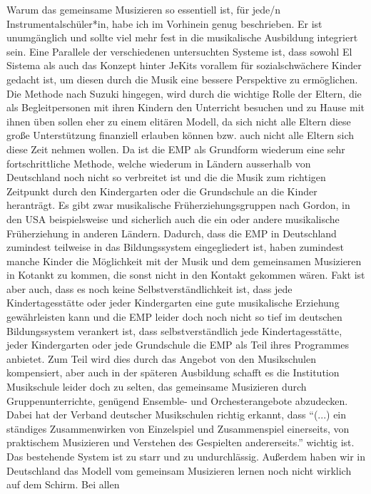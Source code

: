Warum das gemeinsame Musizieren so essentiell ist, für jede/n
Instrumentalschüler*in, habe ich im Vorhinein genug beschrieben. Er ist
unumgänglich und sollte viel mehr fest in die musikalische Ausbildung integriert
sein. Eine Parallele der verschiedenen untersuchten Systeme ist, dass sowohl El
Sistema als auch das Konzept hinter JeKits vorallem für sozialschwächere Kinder
gedacht ist, um diesen durch die Musik eine bessere Perspektive zu ermöglichen.
Die Methode nach Suzuki hingegen, wird durch die wichtige Rolle der Eltern, die
als Begleitpersonen mit ihren Kindern den Unterricht besuchen und zu Hause mit
ihnen üben sollen eher zu einem elitären Modell, da sich nicht alle Eltern diese
große Unterstützung finanziell erlauben können bzw. auch nicht alle Eltern sich
diese Zeit nehmen wollen. Da ist die EMP als Grundform wiederum eine sehr
fortschrittliche Methode, welche wiederum in Ländern ausserhalb von Deutschland
noch nicht so verbreitet ist und die die Musik zum richtigen Zeitpunkt durch den
Kindergarten oder die Grundschule an die Kinder heranträgt. Es gibt zwar
musikalische Früherziehungsgruppen nach Gordon, in den USA beispielsweise und
sicherlich auch die ein oder andere musikalische Früherziehung in anderen
Ländern. Dadurch, dass die EMP in Deutschland zumindest teilweise in das
Bildungssystem eingegliedert ist, haben zumindest manche Kinder die Möglichkeit
mit der Musik und dem gemeinsamen Musizieren in Kotankt zu kommen, die sonst
nicht in den Kontakt gekommen wären. Fakt ist aber auch, dass es noch keine
Selbstverständlichkeit ist, dass jede Kindertagesstätte oder jeder Kindergarten
eine gute musikalische Erziehung gewährleisten kann und die EMP leider doch noch
nicht so tief im deutschen Bildungssystem verankert ist, dass selbstverständlich
jede Kindertagesstätte, jeder Kindergarten oder jede Grundschule die EMP als
Teil ihres Programmes anbietet. Zum Teil wird dies durch das Angebot von den
Musikschulen kompensiert, aber auch in der späteren Ausbildung schafft es die
Institution Musikschule leider doch zu selten, das gemeinsame Musizieren durch
Gruppenunterrichte, genügend Ensemble- und Orchesterangebote abzudecken. Dabei
hat der Verband deutscher Musikschulen richtig erkannt, dass \enquote{(...) ein
ständiges Zusammenwirken von Einzelspiel und Zusammenspiel einerseits, von
praktischem Musizieren und Verstehen des Gespielten andererseits.} wichtig ist.
\autocite[22]{losert:die_kunst_zu_unterrichten} Das bestehende System ist zu
starr und zu undurchlässig. Außerdem haben wir in Deutschland das Modell vom
gemeinsam Musizieren lernen noch nicht wirklich auf dem Schirm. Bei allen
